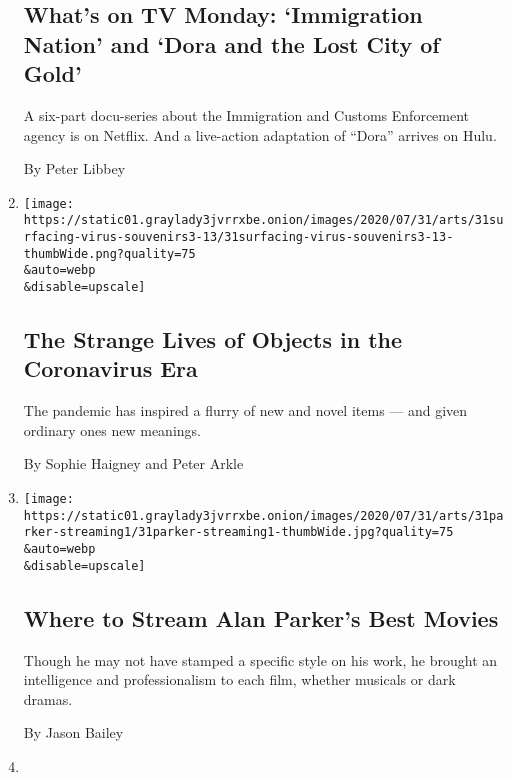 \begin{enumerate}
  \hypertarget{whats-on-tv-monday-immigration-nation-and-dora-and-the-lost-city-of-gold}{%
  \subsection{What's on TV Monday: `Immigration Nation' and `Dora and
  the Lost City of
  Gold'}\label{whats-on-tv-monday-immigration-nation-and-dora-and-the-lost-city-of-gold}}

  A six-part docu-series about the Immigration and Customs Enforcement
  agency is on Netflix. And a live-action adaptation of ``Dora'' arrives
  on Hulu.

  By Peter Libbey
\item
  \href{/2020/08/01/arts/design/virus-design-objects.html}{}

  \texttt{[image: https://static01.graylady3jvrrxbe.onion/images/2020/07/31/arts/31surfacing-virus-souvenirs3-13/31surfacing-virus-souvenirs3-13-thumbWide.png?quality=75\\\&auto=webp\\\&disable=upscale]}

  \hypertarget{the-strange-lives-of-objects-in-the-coronavirus-era}{%
  \subsection{The Strange Lives of Objects in the Coronavirus
  Era}\label{the-strange-lives-of-objects-in-the-coronavirus-era}}

  The pandemic has inspired a flurry of new and novel items --- and
  given ordinary ones new meanings.

  By Sophie Haigney and Peter Arkle
\item
  \href{/2020/07/31/movies/alan-parker-stream.html}{}

  \texttt{[image: https://static01.graylady3jvrrxbe.onion/images/2020/07/31/arts/31parker-streaming1/31parker-streaming1-thumbWide.jpg?quality=75\\\&auto=webp\\\&disable=upscale]}

  \hypertarget{where-to-stream-alan-parkers-best-movies}{%
  \subsection{Where to Stream Alan Parker's Best
  Movies}\label{where-to-stream-alan-parkers-best-movies}}

  Though he may not have stamped a specific style on his work, he
  brought an intelligence and professionalism to each film, whether
  musicals or dark dramas.

  By Jason Bailey
\item
  \href{/2020/07/31/movies/shakuntala-devi-movie.html}{}


\end{enumerate}
